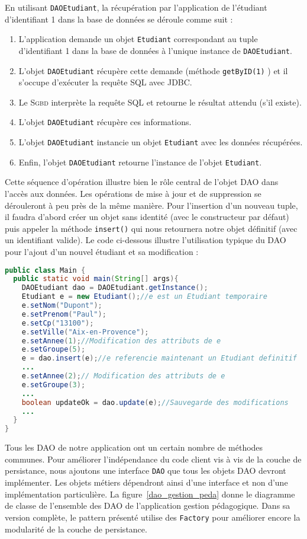 \documentclass[a4paper,11pt]{article}
\begin{document}
En utilisant \texttt{DAOEtudiant}, la récupération par l'application de l'étudiant d'identifiant 1 dans la base de données 
se déroule comme suit :
\begin{enumerate}
 	\item L'application demande un objet \texttt{Etudiant} correspondant au tuple d'identifiant 1 dans la base de données 
 	à l'unique instance de \texttt{DAOEtudiant}.
  \item L'objet \texttt{DAOEtudiant} récupère cette demande (méthode \texttt{getByID(1)} ) et il s'occupe d'exécuter la 
  requête SQL avec JDBC.
  \item Le \textsc{Sgbd} interprète la requête SQL et retourne le résultat attendu (s'il existe).
  \item L'objet \texttt{DAOEtudiant} récupère ces informations.
  \item L'objet \texttt{DAOEtudiant} instancie un objet \texttt{Etudiant} avec les données récupérées.
  \item Enfin, l'objet \texttt{DAOEtudiant} retourne l'instance de l'objet \texttt{Etudiant}.
\end{enumerate}

Cette séquence d'opération illustre bien le rôle central de l'objet DAO dans l'accès aux données. Les opérations de mise 
à jour et de suppression se dérouleront à peu près de la même manière. Pour l'insertion d'un nouveau tuple, il faudra 
d'abord créer un objet sans identité (avec le constructeur par défaut) puis appeler la méthode \texttt{insert()} qui nous 
retournera notre objet définitif (avec un identifiant valide). Le code ci-dessous illustre l'utilisation typique du DAO 
pour l'ajout d'un nouvel étudiant et sa modification :
\begin{lstlisting}[language=java]
public class Main {
  public static void main(String[] args){
    DAOEtudiant dao = DAOEtudiant.getInstance();
    Etudiant e = new Etudiant();//e est un Etudiant temporaire
    e.setNom("Dupont");
    e.setPrenom("Paul");
    e.setCp("13100");
    e.setVille("Aix-en-Provence");
    e.setAnnee(1);//Modification des attributs de e 
    e.setGroupe(5);
    e = dao.insert(e);//e referencie maintenant un Etudiant definitif
    ...
    e.setAnnee(2);// Modification des attributs de e 
    e.setGroupe(3);
    ...
    boolean updateOk = dao.update(e);//Sauvegarde des modifications
    ...
  }
}
\end{lstlisting}
Tous les DAO de notre application ont un certain nombre de méthodes communes. Pour améliorer l'indépendance du code client
vis à vis de la couche de persistance, nous ajoutons une interface \texttt{DAO} que tous les objets DAO devront implémenter. 
Les objets métiers dépendront ainsi d'une interface et non d'une implémentation particulière. La figure~\ref{dao_gestion_peda}
donne le diagramme de classe de l'ensemble des DAO de l'application gestion pédagogique. Dans sa version complète, le 
pattern présenté utilise des \texttt{Factory} pour améliorer encore la modularité de la couche de persistance.  
\end{document}
